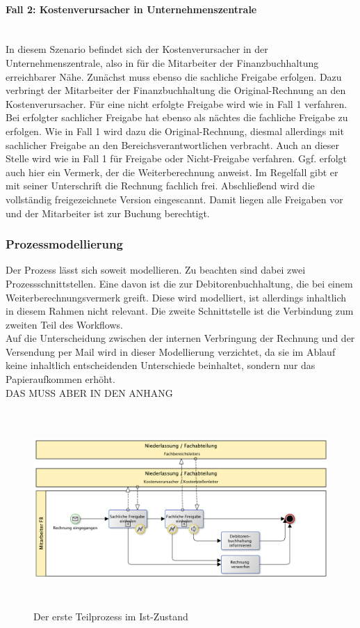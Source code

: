 \paragraph{Fall 2: Kostenverursacher in Unternehmenszentrale}
~\\
In diesem Szenario befindet sich der Kostenverursacher in der Unternehmenszentrale, also in für die Mitarbeiter der Finanzbuchhaltung erreichbarer Nähe.
Zunächst muss ebenso die sachliche Freigabe erfolgen.
Dazu verbringt der Mitarbeiter der Finanzbuchhaltung die Original-Rechnung an den Kostenverursacher.
Für eine nicht erfolgte Freigabe wird wie in Fall 1 verfahren.
Bei erfolgter sachlicher Freigabe hat ebenso als nächtes die fachliche Freigabe zu erfolgen.
Wie in Fall 1 wird dazu die Original-Rechnung, diesmal allerdings mit sachlicher Freigabe an den Bereichsverantwortlichen verbracht.
Auch an dieser Stelle wird wie in Fall 1 für Freigabe oder Nicht-Freigabe verfahren.
Ggf. erfolgt auch hier ein Vermerk, der die Weiterberechnung anweist.
Im Regelfall gibt er mit seiner Unterschrift die Rechnung fachlich frei.
Abschließend wird die vollständig freigezeichnete Version eingescannt.
Damit liegen alle Freigaben vor und der Mitarbeiter ist zur Buchung berechtigt.

\subsubsection{Prozessmodellierung}
Der Prozess lässt sich soweit modellieren. 
Zu beachten sind dabei zwei Prozessschnittstellen. 
Eine davon ist die zur Debitorenbuchhaltung, die bei einem Weiterberechnungsvermerk greift. 
Diese wird modelliert, ist allerdings inhaltlich in diesem Rahmen nicht relevant.
Die zweite Schnittstelle ist die Verbindung zum zweiten Teil des Workflows.\\
Auf die Unterscheidung zwischen der internen Verbringung der Rechnung und der Versendung per Mail wird in dieser Modellierung verzichtet, da sie im Ablauf keine inhaltlich entscheidenden Unterschiede beinhaltet, sondern nur das Papieraufkommen erhöht.
\\
DAS MUSS ABER IN DEN ANHANG

\begin{figure}[!htb]
\centering
\includegraphics[height=75mm]{images/prozess_ist_simpel}
\caption{Der erste Teilprozess im Ist-Zustand}
\label{Teilprozess 1 im Ist-Zustand, BPMN simpel}
\end{figure}

